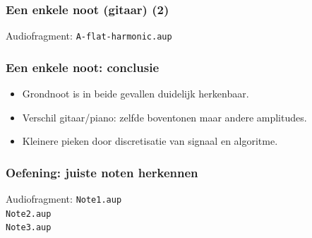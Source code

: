\documentclass[compress, darktitle, framenumber, totalframenumber]{beamer}
\begin{document}
\begin{frame}
\frametitle{Een enkele noot (gitaar) (2)}
\begin{block}{Audiofragment:}
\texttt{A-flat-harmonic.aup} 
\end{block}
\pause
{}
\end{frame}

\begin{frame}
\frametitle{Een enkele noot: conclusie}
\begin{itemize}
\item Grondnoot is in beide gevallen duidelijk herkenbaar.
\item Verschil gitaar/piano: zelfde boventonen maar andere amplitudes. 
\item Kleinere pieken door discretisatie van signaal en algoritme. 
\end{itemize}
\end{frame}

\begin{frame}
\frametitle{Oefening: juiste noten herkennen}
\begin{block}{Audiofragment:}
\texttt{Note1.aup} \\
\texttt{Note2.aup} \\
\texttt{Note3.aup} 
\end{block}
\end{frame}
\end{document}
